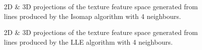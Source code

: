 \begin{figure}[H]
	\centering
	\caption{2D \& 3D projections of the texture feature space generated from lines produced by the Isomap algorithm with 4 neighbours.}\label{fig:texture_iso_mapping_lines}
\end{figure}

\begin{figure}[H]
	\centering
	\caption{2D \& 3D projections of the texture feature space generated from lines produced by the LLE algorithm with 4 neighbours.}\label{fig:texture_LLE_mapping_lines}
\end{figure}
\clearpage

